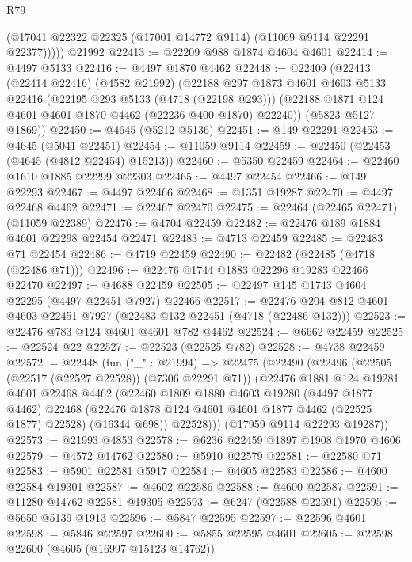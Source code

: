 \begin{lexlean}{R79}
\begin{coremodule}
          (@17041 @22322 @22325 (@17001 @14772 @9114) (@11069 @9114 @22291 @22377)))))
    @21992
@22413 := @22209 @988 @1874 @4604 @4601
@22414 := @4497 @5133
@22416 := @4497 @1870 @4462
@22448 := @22409
    (@22413
      (@22414 @22416)
      (@4582 @21992)
      (@22188
        @297
        @1873
        @4601
        @4603
        @5133
        @22416
        (@22195 @293 @5133 (@4718 (@22198 @293)))
        (@22188 @1871 @124 @4601 @4601 @1870 @4462 (@22236 @400 @1870) @22240))
      (@5823 @5127 @1869))
@22450 := @4645 (@5212 @5136)
@22451 := @149 @22291
@22453 := @4645 (@5041 @22451)
@22454 := @11059 @9114
@22459 := @22450 (@22453 (@4645 (@4812 @22454) @15213))
@22460 := @5350 @22459
@22464 := @22460 @1610 @1885 @22299 @22303
@22465 := @4497 @22454
@22466 := @149 @22293
@22467 := @4497 @22466
@22468 := @1351 @19287
@22470 := @4497 @22468 @4462
@22471 := @22467 @22470
@22475 := @22464 (@22465 @22471) (@11059 @22389)
@22476 := @4704 @22459
@22482 := @22476 @189 @1884 @4601 @22298 @22454 @22471
@22483 := @4713 @22459
@22485 := @22483 @71 @22454
@22486 := @4719 @22459
@22490 := @22482 (@22485 (@4718 (@22486 @71)))
@22496 := @22476 @1744 @1883 @22296 @19283 @22466 @22470
@22497 := @4688 @22459
@22505 := @22497 @145 @1743 @4604 @22295 (@4497 @22451 @7927) @22466
@22517 := @22476 @204 @812 @4601 @4603 @22451 @7927 (@22483 @132 @22451 (@4718 (@22486 @132)))
@22523 := @22476 @783 @124 @4601 @4601 @782 @4462
@22524 := @6662 @22459
@22525 := @22524 @22
@22527 := @22523 (@22525 @782)
@22528 := @4738 @22459
@22572 := @22448
    (fun ("_" : @21994) =>
    @22475
      (@22490
        (@22496
          (@22505 (@22517 (@22527 @22528)) (@7306 @22291 @71))
          (@22476
            @1881
            @124
            @19281
            @4601
            @22468
            @4462
            (@22460
              @1809
              @1880
              @4603
              @19280
              (@4497 @1877 @4462)
              @22468
              (@22476 @1878 @124 @4601 @4601 @1877 @4462 (@22525 @1877) @22528)
              (@16344 @698))
            @22528)))
      (@17959 @9114 @22293 @19287))
@22573 := @21993 @4853
@22578 := @6236 @22459 @1897 @1908 @1970 @4606
@22579 := @4572 @14762
@22580 := @5910 @22579
@22581 := @22580 @71
@22583 := @5901 @22581 @5917
@22584 := @4605 @22583
@22586 := @4600 @22584 @19301
@22587 := @4602 @22586
@22588 := @4600 @22587
@22591 := @11280 @14762 @22581 @19305
@22593 := @6247 (@22588 @22591)
@22595 := @5650 @5139 @1913
@22596 := @5847 @22595
@22597 := @22596 @4601
@22598 := @5846 @22597
@22600 := @5855 @22595 @4601
@22605 := @22598 @22600 (@4605 (@16997 @15123 @14762))

\end{coremodule}
\end{lexlean}
